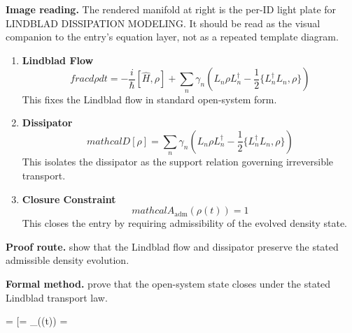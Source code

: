 \begin{samepage}
\noindent\begin{minipage}[t]{0.45\linewidth}
\vspace{0pt}
\raggedright
\scriptsize\textbf{Image reading.} The rendered manifold at right is the per-ID light plate for LINDBLAD DISSIPATION MODELING. It should be read as the visual companion to the entry's equation layer, not as a repeated template diagram.\par
\end{minipage}\hfill
\begin{minipage}[t]{0.53\linewidth}
\vspace*{-0.10in}
\raggedright
{}
\end{minipage}
\end{samepage}

\clearpage


\begin{enumerate}[leftmargin=1.6em,itemsep=9pt,topsep=6pt]
\item \textbf{Lindblad Flow}
\[
frac{d\rho}{dt}=-\frac{i}{\hbar}[\widehat{H},\rho]+\sum_{n}\gamma_{n}\left(L_{n}\rho L_{n}^{\dagger}-\frac{1}{2}\{L_{n}^{\dagger}L_{n},\rho\}\right)
\]
This fixes the Lindblad flow in standard open-system form.

\item \textbf{Dissipator}
\[
mathcal{D}[\rho]=\sum_{n}\gamma_{n}\left(L_{n}\rho L_{n}^{\dagger}-\frac{1}{2}\{L_{n}^{\dagger}L_{n},\rho\}\right)
\]
This isolates the dissipator as the support relation governing irreversible transport.

\item \textbf{Closure Constraint}
\[
mathcal{A}_{\mathrm{adm}}\!\left(\rho(t)\right)=1
\]
This closes the entry by requiring admissibility of the evolved density state.
\end{enumerate}

\textbf{Proof route.} show that the Lindblad flow and dissipator preserve the stated admissible density evolution.

\textbf{Formal method.} prove that the open-system state closes under the stated Lindblad transport law.

\medskip
{}

\begin{tzpsnapshot}
\end{tzpsnapshot}

\tzpequationlinks
  { = \cdots}
  {[\rho = \cdots}
  {_{}\!\left(\rho(t)\right) = \cdots}
